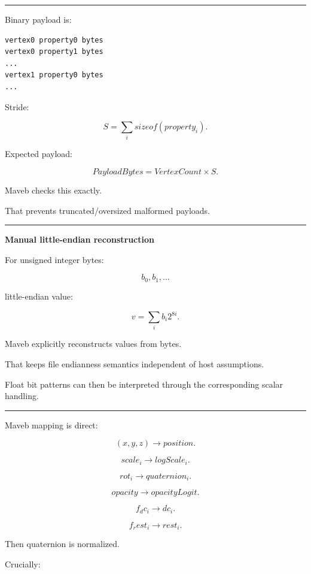 \begin{center}\rule{0.5\linewidth}{0.5pt}\end{center}

Binary payload is:

\protect{}\label{j6pgmr}%
\begin{verbatim}
vertex0 property0 bytes
vertex0 property1 bytes
...
vertex1 property0 bytes
...
\end{verbatim}

Stride:

\[
S=
\sum_i
sizeof(property_i).
\]

Expected payload:

\[
PayloadBytes
=
VertexCount\times S.
\]

Maveb checks this exactly.

That prevents truncated/oversized malformed payloads.

\begin{center}\rule{0.5\linewidth}{0.5pt}\end{center}

\textbf{Manual little-endian reconstruction}

For unsigned integer bytes:

\[
b_0,b_1,\dots
\]

little-endian value:

\[
v=
\sum_i
b_i2^{8i}.
\]

Maveb explicitly reconstructs values from bytes.

That keeps file endianness semantics independent of host assumptions.

Float bit patterns can then be interpreted through the corresponding scalar handling.

\begin{center}\rule{0.5\linewidth}{0.5pt}\end{center}

Maveb mapping is direct:

\[
(x,y,z)
\rightarrow
position.
\]

\[
scale_i
\rightarrow
logScale_i.
\]

\[
rot_i
\rightarrow
quaternion_i.
\]

\[
opacity
\rightarrow
opacityLogit.
\]

\[
f_dc_i
\rightarrow
dc_i.
\]

\[
f_rest_i
\rightarrow
rest_i.
\]

Then quaternion is normalized.

Crucially:

